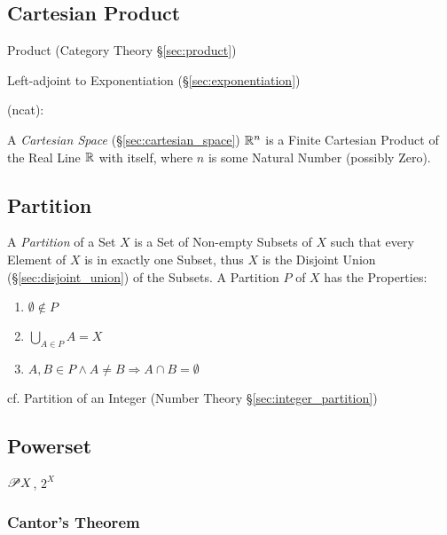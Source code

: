 \subsection{Cartesian Product}\label{sec:cartesian_product}

\fist Product (Category Theory \S\ref{sec:product})

Left-adjoint to Exponentiation (\S\ref{sec:exponentiation})

(ncat):

A \emph{Cartesian Space} (\S\ref{sec:cartesian_space}) $\mathbb{R}^n$ is a Finite
Cartesian Product of the Real Line $\mathbb{R}$ with itself, where $n$ is some
Natural Number (possibly Zero).



\subsection{Partition}\label{sec:set_partition}

A \emph{Partition} of a Set $X$ is a Set of Non-empty Subsets of $X$
such that every Element of $X$ is in exactly one Subset, thus $X$ is
the Disjoint Union (\S\ref{sec:disjoint_union}) of the Subsets. A
Partition $P$ of $X$ has the Properties:
\begin{enumerate}
  \item $\emptyset \notin P$
  \item $\bigcup_{A \in P}A = X$
  \item $A,B \in P \wedge A \neq B \Rightarrow A \cap B = \emptyset$
\end{enumerate}

cf. Partition of an Integer (Number Theory \S\ref{sec:integer_partition})



\subsection{Powerset}\label{sec:powerset}

$\mathscr{P}{X}$, $2^X$

\subsubsection{Cantor's Theorem}\label{sec:cantors_theorem}



